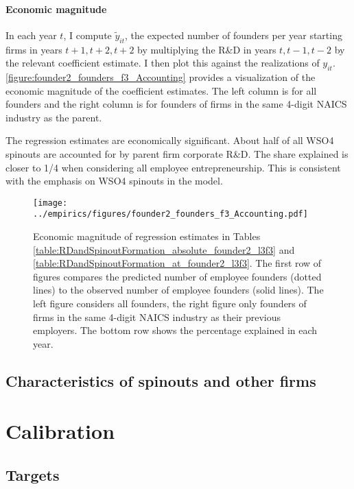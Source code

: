 \documentclass[11pt,english]{article}
\theoremstyle{remark}
\begin{document}
\paragraph{Economic magnitude}

In each year $t$, I compute $\tilde{y}_{it}$, the expected number of founders per year starting firms in years $t+1,t+2,t+2$ by multiplying the R\&D in years $t,t-1,t-2$ by the relevant coefficient estimate. I then plot this against the realizations of $y_{it}$. \autoref{figure:founder2_founders_f3_Accounting} provides a visualization of the economic magnitude of the coefficient estimates. The left column is for all founders and the right column is for founders of firms in the same 4-digit NAICS industry as the parent. 

The regression estimates are economically significant. About half of all WSO4 spinouts are accounted for by parent firm corporate R\&D. The share explained is closer to 1/4 when considering all employee entrepreneurship. This is consistent with the emphasis on WSO4 spinouts in the model. 

\begin{figure}[!htb]
	\texttt{[image: ../empirics/figures/founder2\_founders\_f3\_Accounting.pdf]}
	\caption{Economic magnitude of regression estimates in Tables \ref{table:RDandSpinoutFormation_absolute_founder2_l3f3} and \ref{table:RDandSpinoutFormation_at_founder2_l3f3}. The first row of figures compares the predicted number of employee founders (dotted lines) to the observed number of employee founders (solid lines). The left figure considers all founders, the right figure only founders of firms in the same 4-digit NAICS industry as their previous employers. The bottom row shows the percentage explained in each year.}
	\label{figure:founder2_founders_f3_Accounting}
\end{figure}


\subsection{Characteristics of spinouts and other firms}

\section{Calibration}

\subsection{Targets}
\end{document}
